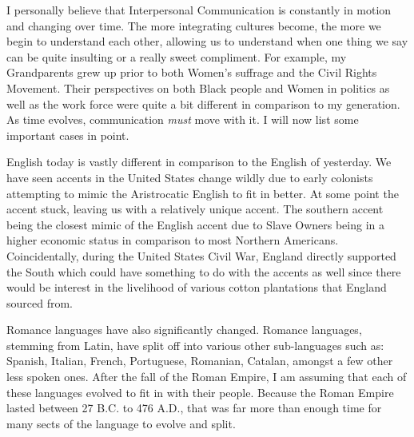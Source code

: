 \documentclass[12pt]{article}
\begin{document}
\par
I personally believe that Interpersonal Communication is constantly in motion and changing over time. The more integrating cultures become, the more we begin to understand each other, allowing us to understand when one thing we say can be quite insulting or a really sweet compliment. For example, my Grandparents grew up prior to both Women's suffrage and the Civil Rights Movement. Their perspectives on  both Black people and Women in politics as well as the work force were quite a bit different in comparison to my generation. As time evolves, communication \emph{must} move with it. I will now list some important cases in point.
\par
English today is vastly different in comparison to the English of yesterday. We have seen accents in the United States change wildly due to early colonists attempting to mimic the Aristrocatic English to fit in better. At some point the accent stuck, leaving us with a relatively unique accent. The southern accent being the closest mimic of the English accent due to Slave Owners being in a higher economic status in comparison to most Northern Americans. Coincidentally, during the United States Civil War, England directly supported the South which could have something to do with the accents as well since there would be interest in the livelihood of various cotton plantations that England sourced from. 
\par
Romance languages have also significantly changed. Romance languages, stemming from Latin, have split off into various other sub-languages such as: Spanish, Italian, French, Portuguese, Romanian, Catalan, amongst a few other less spoken ones. After the fall of the Roman Empire, I am assuming that each of these languages evolved to fit in with their people. Because the Roman Empire lasted between 27 B.C. to 476 A.D., that was far more than enough time for many sects of the language to evolve and split.
\end{document}
